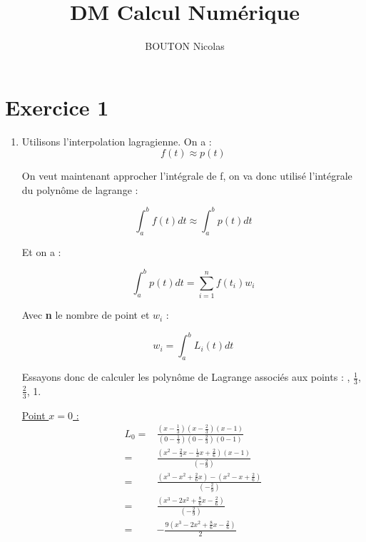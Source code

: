 \documentclass{article}
\title{DM Calcul Numérique}
\author{BOUTON Nicolas}
\begin{document}
\maketitle

\section*{Exercice 1}

\begin{enumerate}

\item 

  Utilisons l'interpolation lagragienne.\newline
  On a :
  $$ f(t) \approx p(t) $$

  On veut maintenant approcher l'intégrale de f, on va donc utilisé
  l'intégrale du polynôme de lagrange :

  \begin{equation*}
    \int_a^b {f(t) dt} \approx \int_a^b {p(t) dt}
  \end{equation*}

  Et on a :

  \begin{equation*}
    \int_a^b {p(t) dt} = \sum_{i = 1}^{n} {f(t_i)w_i}
  \end{equation*}

  Avec \textbf{n} le nombre de point et $w_i$ :

  \begin{equation*}
    w_i = \int_a^b {L_i(t)dt}
  \end{equation*}

Essayons donc de calculer les polynôme de Lagrange associés aux points
: , $\frac{1}{3}$, $\frac{2}{3}$, 1.

\underline{Point $x = 0$ :}
\begin{equation*}
  \begin{split}
    L_0 = & \frac{(x - \frac{1}{3}) (x - \frac{2}{3}) (x - 1)}
    {(0 - \frac{1}{3}) (0 - \frac{2}{3}) (0 - 1)} \\
    = & \frac{(x^2 - \frac{2}{3}x - \frac{1}{3}x + \frac{2}{6}) (x - 1)}
    {(- \frac{2}{9})} \\
    = & \frac{(x^3 - x^2 + \frac{2}{6}x) - (x^2 - x + \frac{2}{6}) }
    {(- \frac{2}{9})} \\
    = & \frac{(x^3 - 2x^2 + \frac{8}{6}x - \frac{2}{6}) }
    {(- \frac{2}{9})} \\
    = & - \frac{ 9 (x^3 - 2x^2 + \frac{8}{6}x - \frac{2}{6}) }
    {2} \\
  \end{split}
\end{equation*}


\end{enumerate}
\end{document}
